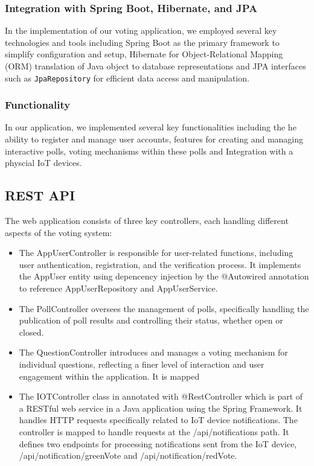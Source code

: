 \subsubsection{Integration with Spring Boot, Hibernate, and JPA}
In the implementation of our voting application, we employed several key technologies and tools including Spring Boot as the primary framework to simplify configuration and setup, Hibernate for Object-Relational Mapping (ORM) translation of Java object to database representations and JPA interfaces such as  \texttt{JpaRepository} for efficient data access and manipulation.


\subsubsection{Functionality}
In our application, we implemented several key functionalities including the he ability to register and manage user accounts, features for creating and managing interactive polls, voting mechanisms within these polls and Integration with a physcial IoT devices.

\subsection{REST API}
The web application consists of three key controllers, each handling different aspects of the voting system:

\begin{itemize}
    \item The AppUserController is responsible for user-related functions, including user authentication, registration, and the verification process.  It implements the AppUser entity using depencency injection by the @Autowired annotation to reference AppUserRepository and AppUserService. 
    \item The PollController oversees the management of polls, specifically handling the publication of poll results and controlling their status, whether open or closed.
    \item The QuestionController introduces and manages a voting mechanism for individual questions, reflecting a finer level of interaction and user engagement within the application.  It is mapped 
    \item The IOTController class in annotated with @RestController which is part of a RESTful web service in a Java application using the Spring Framework. It handles HTTP requests specifically related to IoT device notifications.  The controller is mapped to handle requests at the /api/notifications path.  It defines two endpoints for processing notifications sent from the IoT device, /api/notification/greenVote and /api/notification/redVote.  
\end{itemize}

